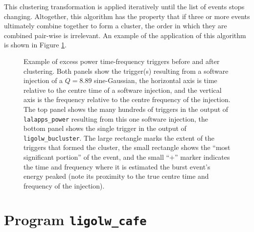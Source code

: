 \documentclass[10pt]{article}
\newcommand{\prog}[1]{\texttt{#1}}
\newenvironment{entry}%
{\begin{list}{}{\renewcommand{\makelabel}[1]%
{\parbox[b]{\labelwidth}{\makebox[0pt][l]{\textbf{##1}}\\}}%
\setlength{\labelwidth}{1em}%
\setlength{\labelsep}{1em}%
\setlength{\leftmargin}{2em}%
\setlength{\topsep}{\medskipamount}%
\setlength{\itemsep}{\medskipamount}%
\setlength{\parsep}{\medskipamount}%
\setlength{\listparindent}{0pt}}}
{\end{list}}
\begin{document}
\begin{entry}
This clustering transformation is applied iteratively until the list of
events stops changing.  Altogether, this algorithm has the property that if
three or more events ultimately combine together to form a cluster, the
order in which they are combined pair-wise is irrelevant.  An example of
the application of this algorithm is shown in Figure \ref{fig2}.
\begin{figure}
\begin{center}
\end{center}
\caption{Example of excess power time-frequency triggers before and after
clustering.  Both panels show the trigger(s) resulting from a software
injection of a \(Q = 8.89\) sine-Gaussian, the horizontal axis is time
relative to the centre time of a software injection, and the vertical axis
is the frequency relative to the centre frequency of the injection.  The
top panel shows the many hundreds of triggers in the output of
\prog{lalapps\_power} resulting from this one software injection, the
bottom panel shows the single trigger in the output of
\prog{ligolw\_bucluster}.  The large rectangle marks the extent of the
triggers that formed the cluster, the small rectangle shows the ``most
significant portion'' of the event, and the small ``\(+\)'' marker
indicates the time and frequency where it is estimated the burst event's
energy peaked (note its proximity to the true centre time and frequency of
the injection).}
\label{fig2}
\end{figure}

\end{entry}


\section{Program \prog{ligolw\_cafe}}
\end{document}
